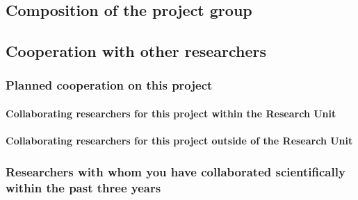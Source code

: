 \documentclass[10pt,fleqn,twoside]{article}
\begin{document}
%

\subsection{Composition of the project group}

\todo{[Text]}

\subsection{Cooperation with other researchers}

\subsubsection{Planned cooperation on this project}

\paragraph{Collaborating researchers for this project within the
  Research Unit}


\paragraph{Collaborating researchers for this project outside of
  the Research Unit}



\subsubsection{Researchers with whom you have collaborated scientifically within the past three years}
\end{document}
